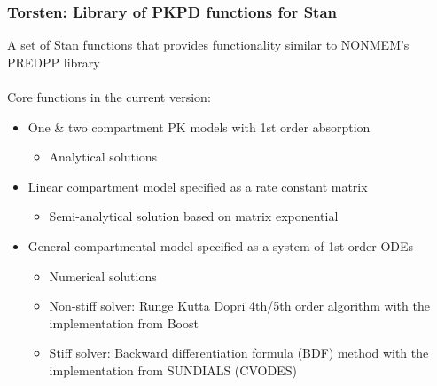 \documentclass{beamer}
\begin{document}
\begin{frame}
  \frametitle{Torsten: Library of PKPD functions for Stan}
  
  A set of Stan functions that provides functionality
  similar to NONMEM's PREDPP library \\
  \ \\ Core functions in the current version:
  \begin{itemize}
  \item<1-> One \& two compartment PK models with 1st order absorption
    \begin{itemize}
    \item Analytical solutions
    \end{itemize}
  \item<2-> Linear compartment model specified as a rate constant matrix
    \begin{itemize}
    \item Semi-analytical solution based on matrix exponential
    \end{itemize}
  \item<3-> General compartmental model specified as a system of 1st order
    ODEs
    \begin{itemize}
\item Numerical solutions
    \item Non-stiff solver: Runge Kutta Dopri 4th/5th order algorithm with the
  implementation from Boost
\item Stiff solver: Backward differentiation formula (BDF) method with the
  implementation from SUNDIALS (CVODES)
    \end{itemize}
  \end{itemize}

\end{frame}
\end{document}

